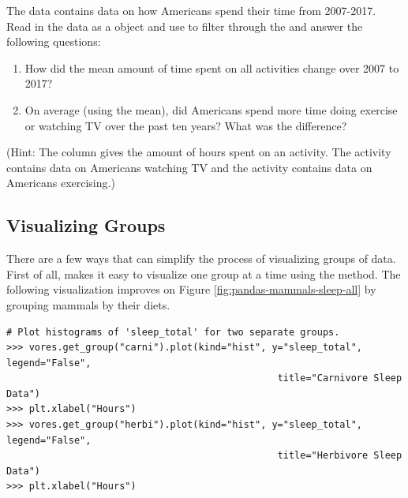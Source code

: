 \begin{problem}
The data  contains data on how Americans spend their time from 2007-2017.
Read in the data as a  object and use  to filter through the  and answer the following questions:

\begin{enumerate}
\item How did the mean amount of time spent on all activities change over 2007 to 2017?

\item On average (using the mean), did Americans spend more time doing exercise or watching TV over the past ten years? What was the difference?
\end{enumerate}

(Hint: The column  gives the amount of hours spent on an activity. The activity  contains data on Americans watching TV and the activity  contains data on Americans exercising.)
\end{problem}

\subsection*{Visualizing Groups} %

There are a few ways that  can simplify the process of visualizing groups of data.
First of all,  makes it easy to visualize one group at a time using the  method.
The following visualization improves on Figure \ref{fig:pandas-mammals-sleep-all} by grouping mammals by their diets.

\begin{lstlisting}
# Plot histograms of 'sleep_total' for two separate groups.
>>> vores.get_group("carni").plot(kind="hist", y="sleep_total", legend="False",
                                                title="Carnivore Sleep Data")
>>> plt.xlabel("Hours")
>>> vores.get_group("herbi").plot(kind="hist", y="sleep_total", legend="False",
                                                title="Herbivore Sleep Data")
>>> plt.xlabel("Hours")
\end{lstlisting}

